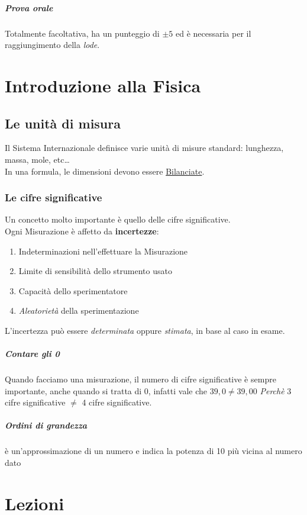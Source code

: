 \documentclass[12pt, a4paper, openany]{book}
\begin{document}
\paragraph*{Prova orale}
Totalmente facoltativa, ha un punteggio di $\pm 5$ ed è necessaria per il raggiungimento della \emph{lode}.

\chapter*{Introduzione alla Fisica}
\section*{Le unità di misura}
Il Sistema Internazionale definisce varie unità di misure standard: lunghezza, massa, mole, etc\dots
\\In una formula, le dimensioni devono essere \underline{Bilanciate}.
\subsection*{Le cifre significative}
Un concetto molto importante è quello delle cifre significative.
\\Ogni Misurazione è affetto da \textbf{incertezze}:
\begin{enumerate}
    \item Indeterminazioni nell'effettuare la Misurazione
    \item Limite di sensibilità dello strumento usato
    \item Capacità dello sperimentatore
    \item \emph{Aleatorietà} della sperimentazione
\end{enumerate}
L'incertezza può essere \emph{determinata} oppure \emph{stimata}, in base al caso in esame.
\paragraph*{Contare gli 0} Quando facciamo una misurazione, il numero di cifre significative è sempre importante, anche quando si tratta di 0,
infatti vale che $39,0 \neq 39,00$ \emph{Perchè} 3 cifre significative $\neq$ 4 cifre significative.
\paragraph*{Ordini di grandezza} è un'approssimazione di un numero e indica la potenza di 10 più vicina al numero dato
\chapter{Lezioni}
\end{document}
